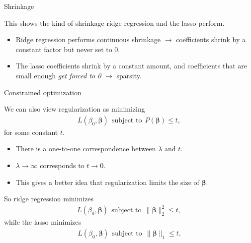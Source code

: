 \documentclass[8pt]{beamer}
\newcommand{\mys}{\vspace{0.5cm} \pause
}
\begin{document}
\begin{frame}{Shrinkage}


This shows the kind of shrinkage ridge regression and the lasso perform.
\begin{itemize}
    \item Ridge regression performs continuous shrinkage $\to$ coefficients shrink by a constant factor but never set to 0.
    \item The lasso coefficients shrink by a constant amount, and coefficients that are small enough \textit{get forced to 0} $\to$ sparsity. %
\end{itemize}
    
\end{frame}

\begin{frame}{\color{white} Constrained optimization}

We can also view regularization as minimizing 
\begin{align*}
    L(\beta_0, \bm{\beta}) ~~\text{subject to}~~ P(\bm{\beta}) \le t,
\end{align*}
for some constant $t$.
\begin{itemize}
    \item There is a one-to-one correspondence between $\lambda$ and $t$.
    \item $\lambda \to \infty$ corresponds to $t \to 0$.
    \item This gives a better idea that regularization limits the size of $\bm{\beta}$.
\end{itemize} \mys 

So ridge regression minimizes 
\begin{align*}
    L(\beta_0, \bm{\beta}) ~~\text{subject to}~~ \| \bm{\beta} \|_2^2 \le t,
\end{align*}
while the lasso minimizes
\begin{align*}
    L(\beta_0, \bm{\beta}) ~~\text{subject to}~~ \| \bm{\beta} \|_1 \le t.
\end{align*}
    
\end{frame}
\end{document}
